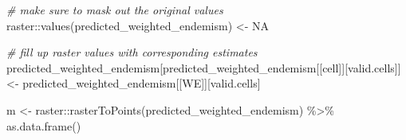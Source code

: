 \documentclass[
]{article}
\newenvironment{Shaded}{\begin{snugshade}}{\end{snugshade}}
\newcommand{\CommentTok}[1]{\textcolor[rgb]{0.56,0.35,0.01}{\textit{#1}}}
\newcommand{\ConstantTok}[1]{\textcolor[rgb]{0.00,0.00,0.00}{#1}}
\newcommand{\FunctionTok}[1]{\textcolor[rgb]{0.00,0.00,0.00}{#1}}
\newcommand{\NormalTok}[1]{#1}
\newcommand{\OtherTok}[1]{\textcolor[rgb]{0.56,0.35,0.01}{#1}}
\newcommand{\SpecialCharTok}[1]{\textcolor[rgb]{0.00,0.00,0.00}{#1}}
\newcommand{\StringTok}[1]{\textcolor[rgb]{0.31,0.60,0.02}{#1}}
\begin{document}
\begin{Shaded}
\begin{Highlighting}[]
\CommentTok{\# make sure to mask out the original values}
\NormalTok{raster}\SpecialCharTok{::}\FunctionTok{values}\NormalTok{(predicted\_weighted\_endemism) }\OtherTok{\textless{}{-}} \ConstantTok{NA} 

\CommentTok{\# fill up raster values with corresponding estimates}
\NormalTok{predicted\_weighted\_endemism[predicted\_weighted\_endemism[[}\StringTok{\textquotesingle{}cell\textquotesingle{}}\NormalTok{]][valid.cells]] }\OtherTok{\textless{}{-}} 
\NormalTok{  predicted\_weighted\_endemism[[}\StringTok{\textquotesingle{}WE\textquotesingle{}}\NormalTok{]][valid.cells]}
\end{Highlighting}
\end{Shaded}

\begin{Shaded}
\begin{Highlighting}[]

\NormalTok{m }\OtherTok{\textless{}{-}}\NormalTok{ raster}\SpecialCharTok{::}\FunctionTok{rasterToPoints}\NormalTok{(predicted\_weighted\_endemism) }\SpecialCharTok{\%\textgreater{}\%}
  \FunctionTok{as.data.frame}\NormalTok{()}


\end{Highlighting}
\end{Shaded}
\end{document}
